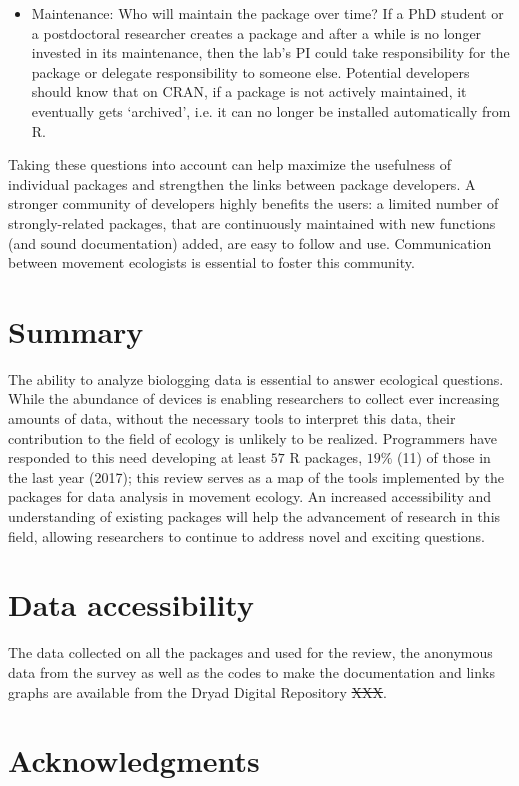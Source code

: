 \documentclass[a4paper,12pt]{article}
\newcommand{\RJ}[2]{\textcolor{purple2}{\sout{#1}}\textcolor{purple1}{#2}} %
\begin{document}
\begin{itemize}
		\item Maintenance: Who will maintain the package over time? If a PhD student or a postdoctoral researcher creates a package and after a while is no longer invested in its maintenance, then the lab's PI could take responsibility for the package or delegate responsibility to someone else. Potential developers should know that on CRAN, if a package is not actively maintained, it eventually gets `archived', i.e. it can no longer be installed automatically from R.
	\end{itemize} 
	
	Taking these questions into account can help maximize the usefulness of individual packages and strengthen the links between package developers. A stronger community of developers  highly benefits the users: a limited number of strongly-related packages, that are continuously maintained with new functions (and sound documentation) added, are easy to follow and use. Communication between movement ecologists is essential to foster this community. 
	
	\section*{Summary}
	
	The ability to analyze biologging data is essential to answer ecological questions. While the abundance of devices is enabling researchers to collect ever increasing amounts of data, without the necessary tools to interpret this data, their contribution to the field of ecology is unlikely to be realized. Programmers have responded to this need developing at least $57$ R packages, $19\%$ (11) of those in the last year (2017); this review serves as a map of the tools implemented by the packages for data analysis in movement ecology. An increased accessibility and understanding of existing packages will help the advancement of research in this field, allowing researchers to continue to address novel and exciting questions. 
	\section*{Data accessibility}
	
	The data collected on all the packages and used for the review, the anonymous data from the survey as well as the codes to make the documentation and links graphs are available from the Dryad Digital Repository \RJ{XXX}. 
	
	\section*{Acknowledgments}
	
\end{document}
